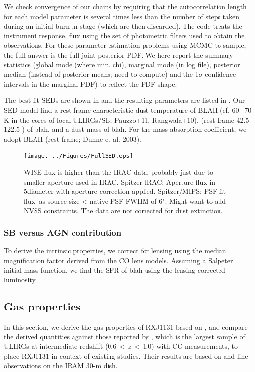 \documentclass[]{emulateapj}
\begin{document}
We check convergence of our chains by requiring that the autocorrelation length for each model parameter is
several times less than the number of steps taken during an initial burn-in stage (which are then discarded).
The code treats the instrument response.
flux using the set of photometric filters used to obtain the observations.
For these parameter estimation problems using MCMC to sample,
the full answer is the full joint posterior PDF.
We here report the summary statistics (global mode (where min. chi),
marginal mode (in log file),
posterior median (instead of posterior means; need to compute) and the
1$\sigma$ confidence intervals in the marginal PDF) to reflect the PDF shape.

The best-fit SEDs are shown in  and the resulting parameters
are listed in .
Our SED model find a rest-frame characteristic dust temperature of BLAH
(cf. 60$-$70\,K in the cores of local ULIRGs/SB; Pauzzo+11, Rangwala+10),
\fir (rest-frame 42.5-122.5 \micron) of blah, and a dust mass of blah.
For the mass absorption coefficient, we adopt BLAH (rest frame; Dunne et al. 2003).


\begin{figure}[tbph]
\centering
\texttt{[image: ../Figures/FullSED.eps]}
\caption{
WISE flux is higher than the IRAC data, probably just due to smaller aperture used in IRAC.
Spitzer IRAC: Aperture flux in 5\farcs diameter with aperture correction applied.
Spitzer/MIPS: PSF fit flux, as source size <
native PSF FWHM of 6".
Might want to add NVSS constraints.
The data are not corrected for dust extinction.
 \label{fig:SED}}
\end{figure}

\subsubsection{SB versus AGN contribution}
To derive the intrinsic properties, we correct for lensing using the
median magnification factor derived from the CO lens models.
Assuming a Salpeter initial mass function, we find the SFR of blah using the
lensing-corrected \fir luminosity.


\subsection{Gas properties}
In this section, we derive the gas properties of RXJ1131 based on \bco,
and compare the derived quantities against those reported by
\citet[hereafter C13]{Combes13a}, which is the largest sample of
ULIRGs at intermediate redshift (0.6\,$<$\,$z$\,$<$\,1.0) with CO measurements,
to place RXJ1131 in context of existing studies. Their results are
based on \bco and  line observations on the IRAM 30-m dish.
\end{document}
